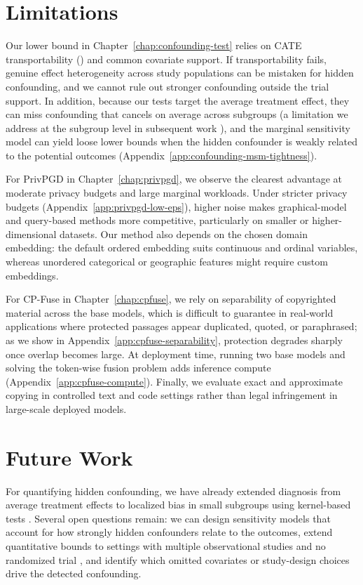 \section{Limitations}

Our lower bound in Chapter~\ref{chap:confounding-test} relies on CATE transportability () and common covariate support. If transportability fails, genuine effect heterogeneity across study populations can be mistaken for hidden confounding, and we cannot rule out stronger confounding outside the trial support. In addition, because our tests target the average treatment effect, they can miss confounding that cancels on average across subgroups (a limitation we address at the subgroup level in subsequent work \citep{debartolomeis2024detecting}), and the marginal sensitivity model can yield loose lower bounds when the hidden confounder is weakly related to the potential outcomes (Appendix~\ref{app:confounding-msm-tightness}).

For PrivPGD in Chapter~\ref{chap:privpgd}, we observe the clearest advantage at moderate privacy budgets and large marginal workloads. Under stricter privacy budgets (Appendix~\ref{app:privpgd-low-eps}), higher noise makes graphical-model and query-based methods more competitive, particularly on smaller or higher-dimensional datasets. Our method also depends on the chosen domain embedding: the default ordered embedding suits continuous and ordinal variables, whereas unordered categorical or geographic features might require custom embeddings.

For CP-Fuse in Chapter~\ref{chap:cpfuse}, we rely on separability of copyrighted material across the base models, which is difficult to guarantee in real-world applications where protected passages appear duplicated, quoted, or paraphrased; as we show in Appendix~\ref{app:cpfuse-separability}, protection degrades sharply once overlap becomes large. At deployment time, running two base models and solving the token-wise fusion problem adds inference compute (Appendix~\ref{app:cpfuse-compute}). Finally, we evaluate exact and approximate copying in controlled text and code settings rather than legal infringement in large-scale deployed models.

\section{Future Work}

For quantifying hidden confounding, we have already extended diagnosis from average treatment effects to localized bias in small subgroups using kernel-based tests \citep{debartolomeis2024detecting}. Several open questions remain: we can design sensitivity models that account for how strongly hidden confounders relate to the outcomes, extend quantitative bounds to settings with multiple observational studies and no randomized trial \citep{karlsson2023detecting}, and identify which omitted covariates or study-design choices drive the detected confounding.

